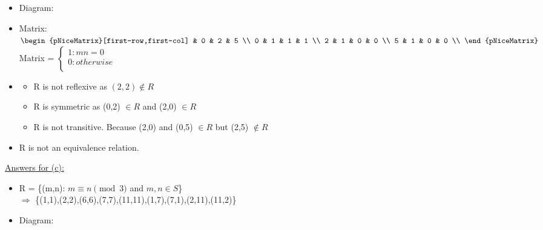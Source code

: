 \documentclass{article}
\begin{document}
\begin{enumerate}
\begin{itemize}
    \item Diagram:\\

    \item Matrix:\\
        $\begin{pNiceMatrix}[first-row,first-col]
           & 0 & 2 & 5        \\
        0  & 1 & 1 & 1        \\ 
        2  & 1 & 0 & 0        \\
        5  & 1 & 0 & 0        \\
        \end{pNiceMatrix}$
        \hspace{1cm} Matrix = 
        $\begin{cases}
            1: mn = 0 \\
            0: otherwise\\  
        \end{cases}$ \\
    
    \item \begin{itemize}
       \item R is not reflexive as $(2,2) \notin R$ 
       \item R is symmetric as (0,2) $\in R$ and (2,0) $\in R$
        \item R is not transitive. Because (2,0) and (0,5) $\in R$ but (2,5) $\notin R$  
     \end{itemize}
    \item R is not an equivalence relation.
    
\end{itemize}

\pagebreak %

\underline{Answers for (c):}    

\begin{itemize}
    \item R = \{(m,n): $m \equiv n \pmod{3}$ and $m,n \in S$\}
    \\$\Rightarrow$ \{(1,1),(2,2),(6,6),(7,7),(11,11),(1,7),(7,1),(2,11),(11,2)\}\\

    \item Diagram:\\


\end{itemize}
\end{enumerate}
\end{document}
